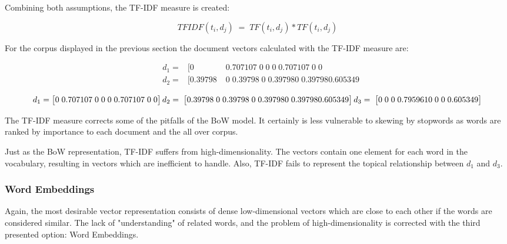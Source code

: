             Combining both assumptions, the \ac{TF-IDF} measure is created:
            
            \[ TFIDF(t_{i}, d_{j}) \;=\; TF(t_{i}, d_{j}) * TF(t_{i}, d_{j})\]
            
            For the corpus displayed in the previous section the document vectors calculated with the \ac{TF-IDF} measure are:
            
                    
            \begin{align}
                &d_1 = & [ 0\;	&0.707107\;	0\;	0\;	0\;	0.707107\;	0\;	0 \\
                &d_2 = & [ 0.39798\;	&0\;	0.39798\;	0\;	0.39798	0\;	0.39798	0.605349 
            \end{align}
                
                \[d_1 = \begin{bmatrix} 0\;	0.707107\;	0\;	0\;	0\;	0.707107\;	0\;	0 \end{bmatrix}	 \\
                d_2 =  \;\begin{bmatrix} 0.39798\;	0\;	0.39798\;	0\;	0.39798	0\;	0.39798	0.605349 \end{bmatrix} \\
                d_3 = \;\begin{bmatrix} 0\;	0\;	0\;	0.795961	0\;	0\;	0\;	0.605349 \end{bmatrix} \]
                
            The \ac{TF-IDF} measure corrects some of the pitfalls of the \ac{BoW} model. It certainly is less vulnerable to skewing by stopwords as words are ranked by importance to each document and the all over corpus. 
            
            Just as the \ac{BoW} representation, \ac{TF-IDF} suffers from high-dimensionality. The vectors contain one element for each word in the vocabulary, resulting in vectors which are inefficient to handle.
            Also, \ac{TF-IDF} fails to represent the topical relationship between $ d_{1} $ and $ d_{3}$. 
            
            \subsubsection{Word Embeddings}
             Again, the most desirable vector representation consists of dense low-dimensional vectors which are close to each other if the words are considered similar. The lack of "understanding" of related words, and the problem of high-dimensionality is corrected with the third presented option: Word Embeddings.
            
